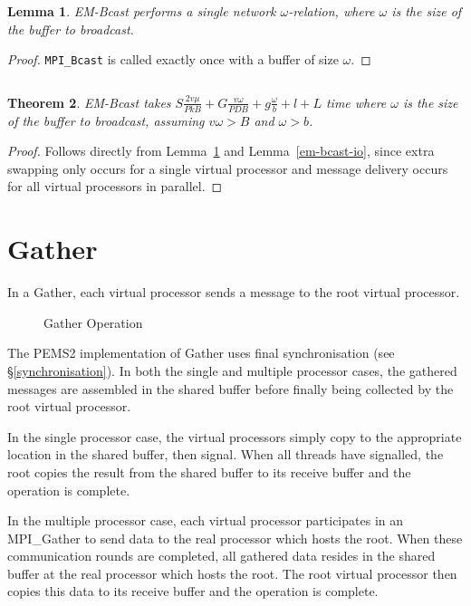 \documentclass[12pt]{carletoncsthesis}
\newtheorem{thm}{Theorem}[section]
\newtheorem{lemma}[thm]{Lemma}
\begin{document}
\begin{lemma}
\label{em-bcast-comm}
{\sc EM-Bcast} performs a single network $\omega$-relation, where $\omega$
is the size of the buffer to broadcast.
\end{lemma}
\begin{proof}
{\tt MPI\_Bcast} is called exactly once with a buffer of size $\omega$.
\end{proof}

$ $ \\

\begin{thm}
\label{em-bcast-time}
{\sc EM-Bcast} takes $S\frac{2v\mu}{PkB} + G\frac{v\omega}{PDB} + g\frac{\omega}{b} + l + L$
time where $\omega$ is the size of the buffer to broadcast, assuming $v\omega > B$
and $\omega > b$.
\end{thm}
\begin{proof}
Follows directly from Lemma~\ref{em-bcast-comm} and Lemma~\ref{em-bcast-io}, since
extra swapping only occurs for a single virtual processor and message delivery
occurs for all virtual processors in parallel.
\end{proof}


\clearpage
\section{Gather}


In a {\sc Gather}, each virtual processor sends a message to the root virtual
processor.

\begin{figure}[ht]
\begin{center}
\caption{Gather Operation}
\end{center}
\end{figure}

The PEMS2 implementation of Gather uses final synchronisation (see
\S\ref{synchronisation}).  In both the single and multiple processor cases,
the gathered messages are assembled in the shared buffer before finally
being collected by the root virtual processor.

In the single processor case, the virtual processors simply copy to the
appropriate location in the shared buffer, then signal.  When all threads
have signalled, the root copies the result from the shared buffer to its
receive buffer and the operation is complete.

In the multiple processor case, each virtual processor participates in an
{\sc MPI\_Gather} to send data to the real processor which hosts the root.
When these communication rounds are completed, all gathered data resides
in the shared buffer at the real processor which hosts the root.  The root
virtual processor then copies this data to its receive buffer and the
operation is complete.
\end{document}
